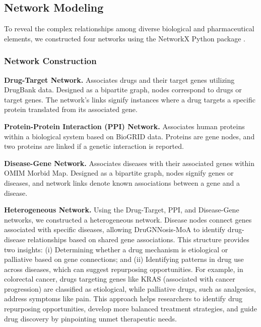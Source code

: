 \documentclass[journal,twoside,web]{ieeecolor}
\begin{document}
\subsection{Network Modeling}
\label{sec:networks}

To reveal the complex relationships among diverse biological and pharmaceutical elements, we constructed four networks using the NetworkX Python package \cite{SciPyProceedings_11}.

\subsubsection{Network Construction}
\label{sec:network_construction_1}
\textbf{Drug-Target Network.}
Associates drugs and their target genes utilizing DrugBank data.
Designed as a bipartite graph, nodes correspond to drugs or target genes.
The network's links signify instances where a drug targets a specific protein translated from its associated gene.

\noindent\textbf{Protein-Protein Interaction (PPI) Network.}
Associates human proteins within a biological system based on BioGRID data.
Proteins are gene nodes, and two proteins are linked if a genetic interaction is reported.

\noindent\textbf{Disease-Gene Network.}
Associates diseases with their associated genes within OMIM Morbid Map.
Designed as a bipartite graph, nodes signify genes or diseases, and network links denote known associations between a gene and a disease.

\noindent\textbf{Heterogeneous Network.}
Using the Drug-Target, PPI, and Disease-Gene networks, we constructed a heterogeneous network.
Disease nodes connect genes associated with specific diseases, allowing DruGNNosis-MoA to identify drug-disease relationships based on shared gene associations.
This structure provides two insights: (i) Determining whether a drug mechanism is etiological or palliative based on gene connections; and (ii) Identifying patterns in drug use across diseases, which can suggest repurposing opportunities.
For example, in colorectal cancer, drugs targeting genes like KRAS (associated with cancer progression) are classified as etiological, while palliative drugs, such as analgesics, address symptoms like pain.
This approach helps researchers to identify drug repurposing opportunities, develop more balanced treatment strategies, and guide drug discovery by pinpointing unmet therapeutic needs.
\end{document}
